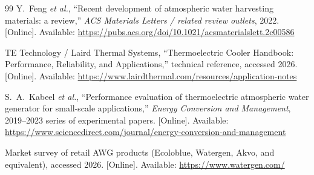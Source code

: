 \documentclass[11pt,a4paper]{article}
\begin{document}
\begin{thebibliography}{99}
Y.~Feng \textit{et al.}, ``Recent development of atmospheric water harvesting materials: a review,'' \textit{ACS Materials Letters / related review outlets}, 2022. [Online]. Available: \url{https://pubs.acs.org/doi/10.1021/acsmaterialslett.2c00586}

TE Technology / Laird Thermal Systems, ``Thermoelectric Cooler Handbook: Performance, Reliability, and Applications,'' technical reference, accessed 2026. [Online]. Available: \url{https://www.lairdthermal.com/resources/application-notes}

S.~A.~Kabeel \textit{et al.}, ``Performance evaluation of thermoelectric atmospheric water generator for small-scale applications,'' \textit{Energy Conversion and Management}, 2019--2023 series of experimental papers. [Online]. Available: \url{https://www.sciencedirect.com/journal/energy-conversion-and-management}

Market survey of retail AWG products (Ecoloblue, Watergen, Akvo, and equivalent), accessed 2026. [Online]. Available: \url{https://www.watergen.com/}

\end{thebibliography}
\end{document}
